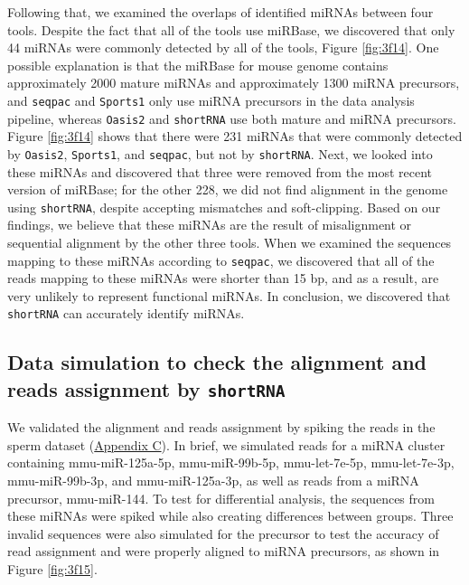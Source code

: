 \documentclass[12pt,twoside]{reedthesis}
\begin{document}
Following that, we examined the overlaps of identified miRNAs between
four tools. Despite the fact that all of the tools use miRBase, we
discovered that only 44 miRNAs were commonly detected by all of the
tools, Figure \ref{fig:3f14}. One possible explanation is that the miRBase for
mouse genome contains approximately 2000 mature miRNAs and approximately
1300 miRNA precursors, and \texttt{seqpac} and \texttt{Sports1} only use miRNA precursors
in the data analysis pipeline, whereas \texttt{Oasis2} and \texttt{shortRNA} use both
mature and miRNA precursors. Figure \ref{fig:3f14} shows that there were 231 miRNAs
that were commonly detected by \texttt{Oasis2}, \texttt{Sports1}, and \texttt{seqpac}, but not by
\texttt{shortRNA}. Next, we looked into these miRNAs and discovered that three
were removed from the most recent version of miRBase; for the other 228,
we did not find alignment in the genome using \texttt{shortRNA}, despite
accepting mismatches and soft-clipping. Based on our findings, we
believe that these miRNAs are the result of misalignment or sequential
alignment by the other three tools. When we examined the sequences
mapping to these miRNAs according to \texttt{seqpac}, we discovered that all of
the reads mapping to these miRNAs were shorter than 15 bp, and as a
result, are very unlikely to represent functional miRNAs. In conclusion,
we discovered that \texttt{shortRNA} can accurately identify miRNAs.



\hypertarget{data-simulation-to-check-the-alignment-and-reads-assignment-by-shortrna}{%
\subsection{\texorpdfstring{Data simulation to check the alignment and reads assignment by \texttt{shortRNA}}{Data simulation to check the alignment and reads assignment by shortRNA}}\label{data-simulation-to-check-the-alignment-and-reads-assignment-by-shortrna}}

We validated the alignment and reads assignment by spiking the reads in
the sperm dataset (\protect\hyperlink{ac}{Appendix C}). In brief, we simulated reads for a miRNA
cluster containing mmu-miR-125a-5p, mmu-miR-99b-5p, mmu-let-7e-5p,
mmu-let-7e-3p, mmu-miR-99b-3p, and mmu-miR-125a-3p, as well as reads
from a miRNA precursor, mmu-miR-144. To test for differential analysis,
the sequences from these miRNAs were spiked while also creating
differences between groups. Three invalid sequences were also simulated
for the precursor to test the accuracy of read assignment and were
properly aligned to miRNA precursors, as shown in Figure \ref{fig:3f15}.
\end{document}
